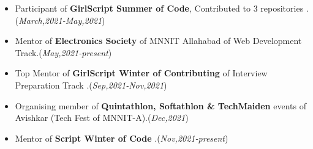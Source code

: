 \documentclass[10pt]{extarticle}
\begin{document}
\begin{itemize}
    \item Participant of \textbf{GirlScript Summer of Code}, Contributed to 3 repositories \href{https://drive.google.com/file/d/1ZPpka9NOeBD6NCzFUj0QpU1cj0x05qnG/view?usp=sharing}{\color{blue}\faArrowCircleRight}.\hfill\hfill(\textit{March,2021-May,2021})
    \item Mentor of \textbf{Electronics Society} of MNNIT Allahabad of Web Development Track.\hfill\hfil(\textit{May,2021-present})
    \item Top Mentor of \textbf{GirlScript Winter of Contributing} of Interview Preparation Track \href{https://drive.google.com/file/d/1Bnlarm8ywCOWPu89gsY8G4Lm4t69lAcG/view?usp=sharing}{\color{blue}\faArrowCircleRight}.\hfill\hfil(\textit{Sep,2021-Nov,2021})
    \item Organising member of \textbf{Quintathlon, Softathlon \& TechMaiden} events of Avishkar (Tech Fest of MNNIT-A).\hfill\hfil(\textit{Dec,2021})
    \item Mentor of \textbf{Script Winter of Code} \href{https://drive.google.com/file/d/1OkTBfQaLLZdllpQLv1GX0zbgSo0CGmrc/view?usp=sharing}{\color{blue}\faArrowCircleRight}.\hfill\hfil(\textit{Nov,2021-present})
\end{itemize}
\end{document}
